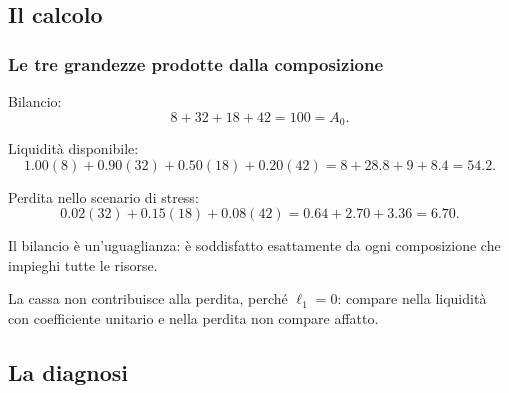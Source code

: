 

\subsection{Il calcolo}%

\begin{frame}%
%

\frametitle{Le tre grandezze prodotte dalla composizione}%
%

%


Bilancio:
\[
8+32+18+42=100=A_{0}.
\]


Liquidit\`{a} disponibile:
\[
1.00(8)+0.90(32)+0.50(18)+0.20(42)=8+28.8+9+8.4=54.2.
\]


Perdita nello scenario di stress:
\[
0.02(32)+0.15(18)+0.08(42)=0.64+2.70+3.36=6.70.
\]


\medskip

\begin{stepitemize}


\item Il bilancio \`{e} un'uguaglianza: \`{e} soddisfatto esattamente da ogni
composizione che impieghi tutte le risorse.

\item La cassa non contribuisce alla perdita, perch\'{e} $\ell_{1}=0$: compare
nella liquidit\`{a} con coefficiente unitario e nella perdita non compare affatto.
\end{stepitemize}

%

\transboxout
\end{frame}%




\subsection{La diagnosi}%

